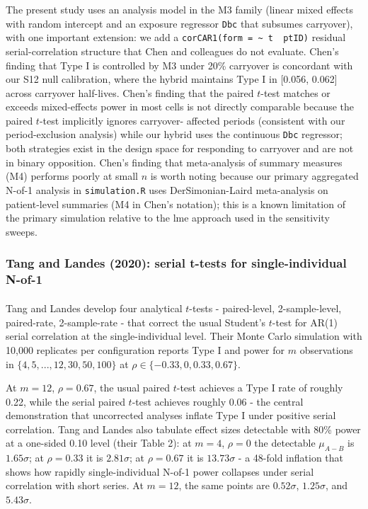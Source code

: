 \documentclass[
  11pt,
]{article}
\begin{document}
The present study uses an analysis model in the M3 family (linear mixed
effects with random intercept and an exposure regressor \texttt{Dbc}
that subsumes carryover), with one important extension: we add a
\texttt{corCAR1(form\ =\ \textasciitilde{}\ t\ \textbar{}\ ptID)}
residual serial-correlation structure that Chen and colleagues do not
evaluate. Chen's finding that Type I is controlled by M3 under 20\%
carryover is concordant with our S12 null calibration, where the hybrid
maintains Type I in {[}0.056, 0.062{]} across carryover half-lives.
Chen's finding that the paired \(t\)-test matches or exceeds
mixed-effects power in most cells is not directly comparable because the
paired \(t\)-test implicitly ignores carryover- affected periods
(consistent with our period-exclusion analysis) while our hybrid uses
the continuous \texttt{Dbc} regressor; both strategies exist in the
design space for responding to carryover and are not in binary
opposition. Chen's finding that meta-analysis of summary measures (M4)
performs poorly at small \(n\) is worth noting because our primary
aggregated N-of-1 analysis in \texttt{simulation.R} uses
DerSimonian-Laird meta-analysis on patient-level summaries (M4 in Chen's
notation); this is a known limitation of the primary simulation relative
to the lme approach used in the sensitivity sweeps.

\subsubsection{Tang and Landes (2020): serial t-tests for
single-individual
N-of-1}\label{tang-and-landes-2020-serial-t-tests-for-single-individual-n-of-1}

Tang and
Landes\textsuperscript{}
develop four analytical \(t\)-tests - paired-level, 2-sample-level,
paired-rate, 2-sample-rate - that correct the usual Student's \(t\)-test
for AR(1) serial correlation at the single-individual level. Their Monte
Carlo simulation with 10,000 replicates per configuration reports Type I
and power for \(m\) observations in \(\{4, 5, ..., 12, 30, 50, 100\}\)
at \(\rho \in \{-0.33, 0, 0.33, 0.67\}\).

At \(m = 12\), \(\rho = 0.67\), the usual paired \(t\)-test achieves a
Type I rate of roughly 0.22, while the serial paired \(t\)-test achieves
roughly 0.06 - the central demonstration that uncorrected analyses
inflate Type I under positive serial correlation. Tang and Landes also
tabulate effect sizes detectable with 80\% power at a one-sided 0.10
level (their Table 2): at \(m = 4\), \(\rho = 0\) the detectable
\(\mu_{A-B}\) is \(1.65 \sigma\); at \(\rho = 0.33\) it is \(2.81
\sigma\); at \(\rho = 0.67\) it is \(13.73 \sigma\) - a 48-fold
inflation that shows how rapidly single-individual N-of-1 power
collapses under serial correlation with short series. At \(m =
12\), the same points are \(0.52 \sigma\), \(1.25 \sigma\), and
\(5.43 \sigma\).
\end{document}
